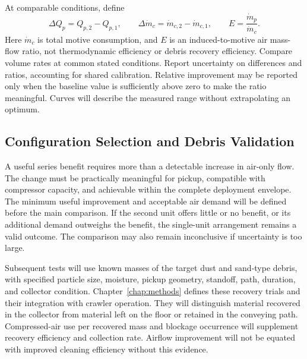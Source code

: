 At comparable conditions, define
\begin{equation}
 \Delta Q_p=Q_{p,2}-Q_{p,1}, \qquad
 \Delta\dot m_c=\dot m_{c,2}-\dot m_{c,1}, \qquad
 E=\frac{\dot m_p}{\dot m_c}.
 \label{eq:vacuum-comparison}
\end{equation}
Here $\dot m_c$ is total motive consumption, and $E$ is an induced-to-motive air mass-flow ratio, not thermodynamic efficiency or debris recovery efficiency. Compare volume rates at common stated conditions. Report uncertainty on differences and ratios, accounting for shared calibration. Relative improvement may be reported only when the baseline value is sufficiently above zero to make the ratio meaningful. Curves will describe the measured range without extrapolating an optimum.


\subsection{Configuration Selection and Debris Validation}
A useful series benefit requires more than a detectable increase in air-only flow. The change must be practically meaningful for pickup, compatible with compressor capacity, and achievable within the complete deployment envelope. The minimum useful improvement and acceptable air demand will be defined before the main comparison. If the second unit offers little or no benefit, or its additional demand outweighs the benefit, the single-unit arrangement remains a valid outcome. The comparison may also remain inconclusive if uncertainty is too large.

Subsequent tests will use known masses of the target dust and sand-type debris, with specified particle size, moisture, pickup geometry, standoff, path, duration, and collector condition. Chapter~\ref{chap:methods} defines these recovery trials and their integration with crawler operation. They will distinguish material recovered in the collector from material left on the floor or retained in the conveying path. Compressed-air use per recovered mass and blockage occurrence will supplement recovery efficiency and collection rate. Airflow improvement will not be equated with improved cleaning efficiency without this evidence.

\par
\endgroup
